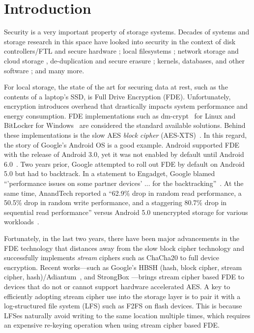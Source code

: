 \section{Introduction}\label{sec:introduction}


Security is a very important property of storage systems. Decades of systems and
storage research in this space have looked into security in the context of disk
controllers/FTL and secure hardware \cite{hardware1, hardware2, hardware3,
hardware4}; local filesystems \cite{filesystems1, filesystems2, filesystems3,
filesystems4, filesystems5, filesystems6, filesystems7}; network storage and
cloud storage \cite{network1, network2, network3, network4, network5, network6,
network7, network8, network9, network10, network11, network12, network13,
network14, network15, network16}, de-duplication and secure erasure
\cite{erase1, erase2, erase3}; kernels, databases, and other software
\cite{software1, software2, software3, software4}; and many more.

For local storage, the state of the art for securing data at rest, such as the
contents of a laptop's SSD, is Full Drive Encryption (FDE). Unfortunately,
encryption introduces overhead that drastically impacts system performance and
energy consumption. FDE implementations such as dm-crypt~\cite{dmcrypt,
DmC-Android} for Linux and BitLocker for Windows~\cite{bitlocker1, bitlocker2}
are considered the standard available solutions. Behind these implementations is
the slow AES \emph{block cipher} (AES-XTS)~\cite{XTS, XTSComments, NISTXTS}. In
this regard, the story of Google's Android OS is a good example. Android
supported FDE with the release of Android 3.0, yet it was not enabled by default
until Android 6.0~\cite{android-M-mobile-motivation}. Two years prior, Google
attempted to roll out FDE by default on Android 5.0 but had to backtrack. In a
statement to Engadget, Google blamed ``'performance issues on some partner
devices' ... for the backtracking''~\cite{google-engadget}. At the same time,
AnandTech reported a ``62.9\% drop in random read performance, a 50.5\% drop in
random write performance, and a staggering 80.7\% drop in sequential read
performance'' versus Android 5.0 unencrypted storage for various
workloads~\cite{android-M-mobile-motivation-2}.

Fortunately, in the last two years, there have been major advancements in the
FDE technology that distances away from the slow block cipher technology and
successfully implements {\em stream} ciphers such as ChaCha20 to full device
encryption. Recent works---such as Google's HBSH (hash, block cipher, stream
cipher, hash)/Adiantum~\cite{Adiantum}, and StrongBox \cite{StrongBox}---brings
stream cipher based FDE to devices that do not or cannot support hardware
accelerated AES. A key to efficiently adopting stream cipher use into the
storage layer is to pair it with a log-structured file system (LFS) such as F2FS
on flash devices. This is because LFSes naturally avoid writing to the same
location multiple times, which requires an expensive re-keying operation when
using stream cipher based FDE.

